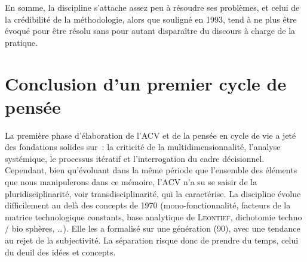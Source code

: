   En somme, la discipline s'attache assez peu à résoudre ses problèmes, et celui de la crédibilité de la méthodologie, alors que souligné en 1993, tend à ne plus être évoqué pour être résolu sans pour autant disparaître du discours à charge de la pratique.
  


\section{Conclusion d'un premier cycle de pensée}
La première phase d'élaboration de l'ACV et de la pensée en cycle de vie a jeté des fondations solides sur~: la criticité de la multidimensionnalité, l'analyse systémique, le processus itératif et l'interrogation du cadre décisionnel.
Cependant, bien qu'évoluant dans la même période que l'ensemble des éléments que nous manipulerons dans ce mémoire,
l'ACV n'a su se saisir de la pluridisciplinarité, voir transdisciplinarité, qui la caractérise.
La discipline évolue difficilement au delà des concepts de 1970 (mono-fonctionnalité, facteurs de la matrice technologique constants, base analytique de \textsc{Leontief}, dichotomie techno / bio sphères, \ldots).
Elle les a formalisé sur une génération (90), avec une tendance au rejet de la subjectivité.
La séparation risque donc de prendre du temps, celui du deuil des idées et concepts. %

